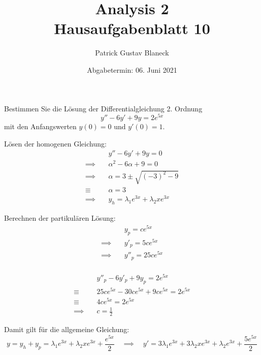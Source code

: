 \documentclass[answers]{exam}
\title{Analysis 2 \\ \large{Hausaufgabenblatt 10}}
\author{Patrick Gustav Blaneck}
\date{Abgabetermin: 06. Juni 2021}
\begin{document}
\maketitle
\begin{questions}
    \question
    Bestimmen Sie die Lösung der Differentialgleichung 2. Ordnung
    $$
        y'' - 6y' + 9y = 2e^{5x}
    $$
    mit den Anfangswerten $y(0) = 0$ und $y'(0) = 1$.
    \begin{solution}
        Lösen der homogenen Gleichung:
        $$
            \begin{aligned}
                               & y'' - 6y' + 9y = 0                         \\
                \implies \quad & \alpha^2 -6 \alpha + 9 = 0                 \\
                \implies \quad & \alpha = 3 \pm \sqrt{(-3)^2 - 9}           \\
                \equiv \quad   & \alpha = 3                                 \\
                \implies \quad & y_h = \lambda_1 e^{3x} + \lambda_2 xe^{3x}
            \end{aligned}
        $$

        Berechnen der partikulären Lösung:
        $$
            \begin{aligned}
                               & y_p = ce^{5x}      \\
                \implies \quad & y'_p = 5ce^{5x}    \\
                \implies \quad & y''_p  = 25ce^{5x} \\
            \end{aligned}
        $$

        $$
            \begin{aligned}
                               & y''_p - 6y'_p + 9y_p = 2e^{5x}             \\
                \equiv \quad   & 25ce^{5x} - 30ce^{5x} + 9ce^{5x} = 2e^{5x} \\
                \equiv \quad   & 4ce^{5x} = 2e^{5x}                         \\
                \implies \quad & c = \frac{1}{2}
            \end{aligned}
        $$

        Damit gilt für die allgemeine Gleichung:
        $$
            y = y_h + y_p = \lambda_1 e^{3x} + \lambda_2 xe^{3x} + \frac{e^{5x}}{2} \quad \implies \quad y' = 3\lambda_1e^{3x} + 3\lambda_2xe^{3x} + \lambda_2 e^{3x} + \frac{5e^{5x}}{2}
        $$


\end{solution}
\end{questions}
\end{document}
